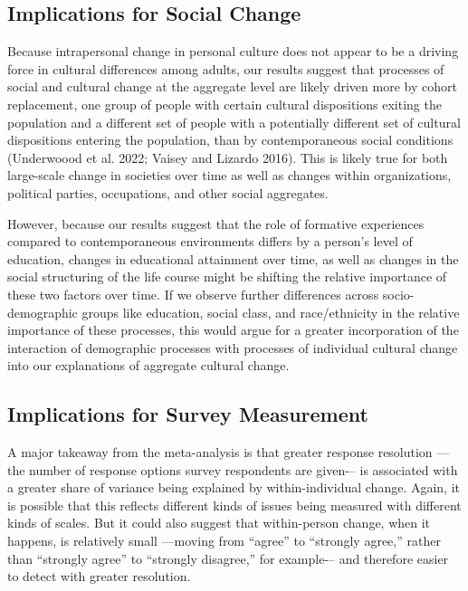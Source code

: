 \documentclass[
  11pt,
]{article}
\begin{document}
\hypertarget{implications-for-social-change}{%
\subsection{Implications for Social
Change}\label{implications-for-social-change}}

Because intrapersonal change in personal culture does not appear to be a
driving force in cultural differences among adults, our results suggest
that processes of social and cultural change at the aggregate level are
likely driven more by cohort replacement, one group of people with
certain cultural dispositions exiting the population and a different set
of people with a potentially different set of cultural dispositions
entering the population, than by contemporaneous social conditions
(Underwoood et al. 2022; Vaisey and Lizardo 2016). This is likely true
for both large-scale change in societies over time as well as changes
within organizations, political parties, occupations, and other social
aggregates.

However, because our results suggest that the role of formative
experiences compared to contemporaneous environments differs by a
person's level of education, changes in educational attainment over
time, as well as changes in the social structuring of the life course
might be shifting the relative importance of these two factors over
time. If we observe further differences across socio-demographic groups
like education, social class, and race/ethnicity in the relative
importance of these processes, this would argue for a greater
incorporation of the interaction of demographic processes with processes
of individual cultural change into our explanations of aggregate
cultural change.

\hypertarget{implications-for-survey-measurement}{%
\subsection{Implications for Survey
Measurement}\label{implications-for-survey-measurement}}

A major takeaway from the meta-analysis is that greater response
resolution ---the number of response options survey respondents are
given-\/-- is associated with a greater share of variance being
explained by within-individual change. Again, it is possible that this
reflects different kinds of issues being measured with different kinds
of scales. But it could also suggest that within-person change, when it
happens, is relatively small ---moving from ``agree'' to ``strongly
agree,'' rather than ``strongly agree'' to ``strongly disagree,'' for
example-\/-- and therefore easier to detect with greater resolution.
\end{document}
